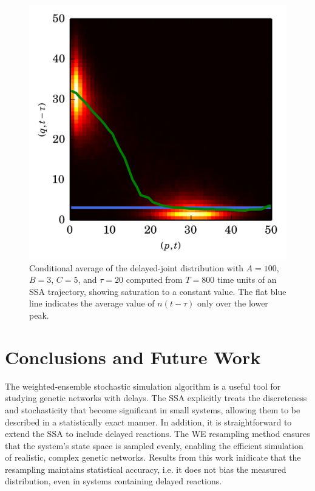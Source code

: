 \documentclass[english,letterpaper,12pt]{report}
\begin{document}
\begin{doublespacing}
\begin{figure}
    \begin{center}
        \includegraphics{../results/thesis/ddjd-ca-a100-c5-t20.png}
    \end{center}
    \caption{Conditional average of the delayed-joint distribution with $A=100$, $B=3$, $C=5$, and $\tau=20$ computed from $T=800$ time units of an SSA trajectory, showing saturation to a constant value. The flat blue line indicates the average value of $n(t-\tau)$ only over the lower peak.}
\end{figure}



\chapter{Conclusions and Future Work} %
\label{sec:conclusions}

The weighted-ensemble stochastic simulation algorithm is a useful tool for studying genetic networks with delays. The SSA explicitly treats the discreteness and stochasticity that become significant in small systems, allowing them to be described in a statistically exact manner. In addition, it is straightforward to extend the SSA to include delayed reactions. The WE resampling method ensures that the system's state space is sampled evenly, enabling the efficient simulation of realistic, complex genetic networks. Results from this work inidicate that the resampling maintains statistical accuracy, i.e. it does not bias the measured distribution, even in systems containing delayed reactions.


\end{doublespacing}
\end{document}
